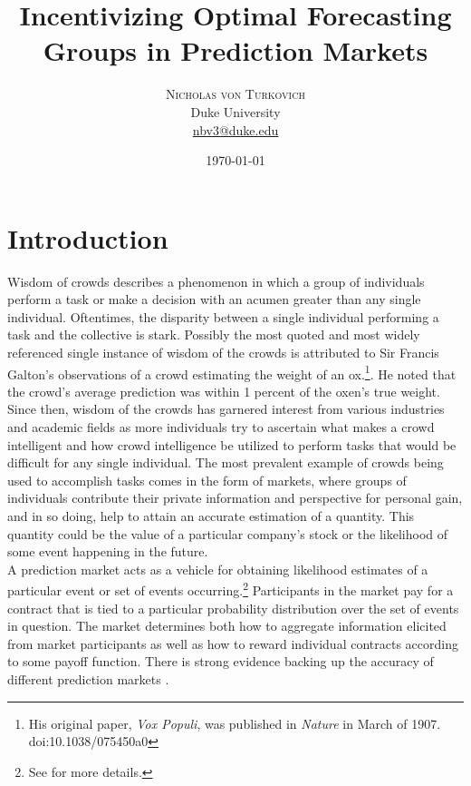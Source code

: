 \documentclass[twoside,twocolumn]{article}
\title{Incentivizing Optimal Forecasting Groups in Prediction Markets} %
\author{%
\textsc{Nicholas von Turkovich} \\%
\normalsize Duke University \\ %
\normalsize \href{mailto:nbv3@duke.edu}{nbv3@duke.edu} %
}
\date{\today} %
\begin{document}
\maketitle


\section{Introduction}

Wisdom of crowds describes a phenomenon in which a group of individuals perform a task or make a decision with an acumen greater than any single individual. Oftentimes, the disparity between a single individual performing a task and the collective is stark. Possibly the most quoted and most widely referenced single instance of wisdom of the crowds is attributed to Sir Francis Galton's observations of a crowd estimating the weight of an ox.\footnote{His original paper, \textit{Vox Populi}, was published in \textit{Nature} in March of 1907. doi:10.1038/075450a0}. He noted that the crowd's average prediction was within 1 percent of the oxen's true weight. Since then, wisdom of the crowds has garnered interest from various industries and academic fields as more individuals try to ascertain what makes a crowd intelligent and how crowd intelligence be utilized to perform tasks that would be difficult for any single individual. The most prevalent example of crowds being used to accomplish tasks comes in the form of markets, where groups of individuals contribute their private information and perspective for personal gain, and in so doing, help to attain an accurate estimation of a quantity. This quantity could be the value of a particular company's stock or the likelihood of some event happening in the future.\\
\newline
A prediction market acts as a vehicle for obtaining likelihood estimates of a particular event or set of events occurring.\footnote{See \cite{1} for more details.} Participants in the market pay for a contract that is tied to a particular probability distribution over the set of events in question. The market determines both how to aggregate information elicited from market participants as well as how to reward individual contracts according to some payoff function. There is strong evidence backing up the accuracy of different prediction markets \cite{2}.\\
\end{document}
